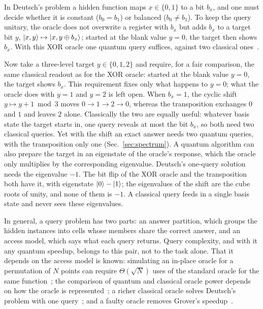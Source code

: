 \documentclass[
  aps,
  pra,
  reprint,
  nofootinbib
]{revtex4-2}
\begin{document}
In Deutsch's problem a hidden function maps \(x\in\{0,1\}\) to a bit \(b_x\),
and one must decide whether it is constant (\(b_0=b_1\)) or balanced
(\(b_0\neq b_1\)). To keep the query unitary, the oracle does not overwrite a
register with \(b_x\) but adds \(b_x\) to a target bit \(y\),
\(\ket{x,y}\mapsto\ket{x,y\oplus b_x}\); started at the blank value \(y=0\),
the target then shows \(b_x\). With this XOR oracle one quantum query
suffices, against two classical ones~\cite{deutsch,deutsch:92,cleve:98}.

Now take a three-level target \(y\in\{0,1,2\}\) and require, for a fair
comparison, the same classical readout as for the XOR oracle: started at the
blank value \(y=0\), the target shows \(b_x\). This requirement fixes only
what happens to \(y=0\); what the oracle does with \(y=1\) and \(y=2\) is
left open. When
\(b_x=1\), the cyclic shift \(y\mapsto y+1\bmod 3\) moves
\(0\to1\to2\to0\), whereas the transposition exchanges \(0\) and \(1\) and
leaves \(2\) alone. Classically the two are equally useful: whatever basis
state the target starts in, one query reveals at most the bit \(b_x\), so
both need two classical queries. Yet with the shift an exact answer needs two
quantum queries, with the transposition only one (Sec.~\ref{sec:spectrum}).
A quantum algorithm can also prepare the target in an eigenstate of the
oracle's response, which the oracle only multiplies by the corresponding
eigenvalue. Deutsch's one-query solution needs the eigenvalue \(-1\). The bit
flip of the XOR oracle and the transposition both have it, with eigenstate
\(\ket0-\ket1\); the eigenvalues of the shift are the cube roots of unity, and
none of them is \(-1\). A classical query feeds in a single basis state and
never sees these eigenvalues.

In general, a query problem has two parts: an answer partition, which groups
the hidden instances into cells whose members share the correct answer, and an
access model, which says what each query returns. Query complexity, and with it
any quantum speedup, belongs to this pair, not to the task alone. That it
depends on the access model is known: simulating an in-place oracle for a
permutation of \(N\) points can require \(\Theta(\sqrt N)\) uses of the
standard oracle for the same function~\cite{KashefiKentVedralBanaszek2002};
the comparison of quantum and classical oracle power depends on how the oracle
is represented~\cite{WojcikChhajlany2006}; a richer classical oracle solves
Deutsch's problem with one query~\cite{Calude2006Dequantising}; and a faulty
oracle removes Grover's speedup~\cite{RegevSchiff2008}.
\end{document}

